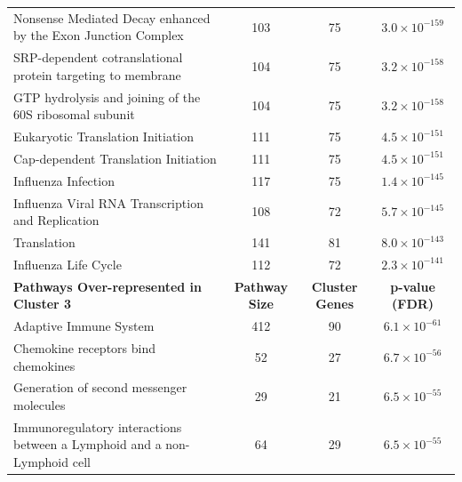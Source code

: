 \begin{table}[!hp]
{\begin{threeparttable}
\begin{tabular}{lccc}
  \rowcolor{Cluster_Green!15} 
  Nonsense Mediated Decay enhanced by the Exon Junction Complex & 103 &  75 & $3.0 \times 10^{-159}$ \\
  \rowcolor{Cluster_Green!20} 
  SRP-dependent cotranslational protein targeting to membrane & 104 &  75 & $3.2 \times 10^{-158}$ \\
  \rowcolor{Cluster_Green!15} 
  GTP hydrolysis and joining of the 60S ribosomal subunit & 104 &  75 & $3.2 \times 10^{-158}$ \\
  \rowcolor{Cluster_Green!20} 
  Eukaryotic Translation Initiation & 111 &  75 & $4.5 \times 10^{-151}$ \\
  \rowcolor{Cluster_Green!15} 
  Cap-dependent Translation Initiation & 111 &  75 & $4.5 \times 10^{-151}$ \\
  \rowcolor{Cluster_Green!20} 
  Influenza Infection & 117 &  75 & $1.4 \times 10^{-145}$ \\
  \rowcolor{Cluster_Green!15} 
  Influenza Viral RNA Transcription and Replication & 108 &  72 & $5.7 \times 10^{-145}$ \\
  \rowcolor{Cluster_Green!20} 
  Translation & 141 &  81 & $8.0 \times 10^{-143}$ \\
  \rowcolor{Cluster_Green!15} 
  Influenza Life Cycle & 112 &  72 & $2.3 \times 10^{-141}$ \\
  \hline
  \cellcolor{white} \large{\textbf{Pathways Over-represented in Cluster 3}} & \large{\textbf{Pathway Size}} & \large{\textbf{Cluster Genes}} & \large{\textbf{p-value (FDR)}} \\ %
  \hline
  \rowcolor{Cluster_Orange!30}
  Adaptive Immune System & 412 &  90 & $6.1 \times 10^{-61}$ \\
  \rowcolor{Cluster_Orange!20} 
  Chemokine receptors bind chemokines &  52 &  27 & $6.7 \times 10^{-56}$ \\
  \rowcolor{Cluster_Orange!30} 
  Generation of second messenger molecules &  29 &  21 & $6.5 \times 10^{-55}$ \\
  \rowcolor{Cluster_Orange!20} 
  Immunoregulatory interactions between a Lymphoid and a non-Lymphoid cell &  64 &  29 & $6.5 \times 10^{-55}$ \\

\end{tabular}
\end{threeparttable}}
\end{table}
